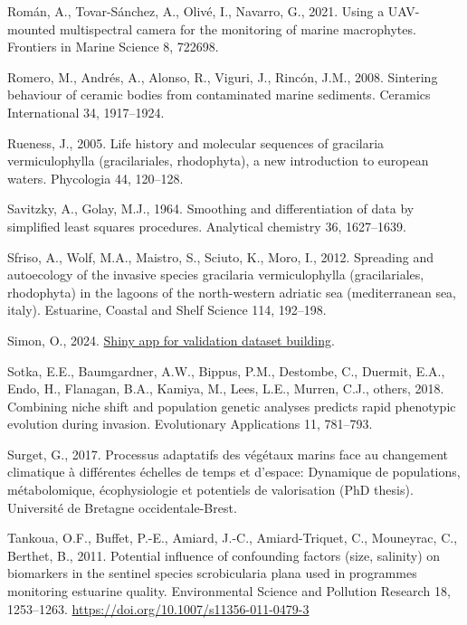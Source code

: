 \documentclass[
  letterpaper,
  DIV=11,
  numbers=noendperiod]{scrartcl}
\newlength{\cslhangindent}
\newenvironment{CSLReferences}[2] %
 {\begin{list}{}{%
  \setlength{\itemindent}{0pt}
  \setlength{\leftmargin}{0pt}
  \setlength{\parsep}{0pt}
  \ifodd #1
   \setlength{\leftmargin}{\cslhangindent}
   \setlength{\itemindent}{-1\cslhangindent}
  \fi
  \setlength{\itemsep}{#2\baselineskip}}}
 {\end{list}}
\begin{document}
\begin{CSLReferences}{1}{0}
Román, A., Tovar-Sánchez, A., Olivé, I., Navarro, G., 2021. Using a
UAV-mounted multispectral camera for the monitoring of marine
macrophytes. Frontiers in Marine Science 8, 722698.

Romero, M., Andrés, A., Alonso, R., Viguri, J., Rincón, J.M., 2008.
Sintering behaviour of ceramic bodies from contaminated marine
sediments. Ceramics International 34, 1917--1924.

Rueness, J., 2005. Life history and molecular sequences of gracilaria
vermiculophylla (gracilariales, rhodophyta), a new introduction to
european waters. Phycologia 44, 120--128.

Savitzky, A., Golay, M.J., 1964. Smoothing and differentiation of data
by simplified least squares procedures. Analytical chemistry 36,
1627--1639.

Sfriso, A., Wolf, M.A., Maistro, S., Sciuto, K., Moro, I., 2012.
Spreading and autoecology of the invasive species gracilaria
vermiculophylla (gracilariales, rhodophyta) in the lagoons of the
north-western adriatic sea (mediterranean sea, italy). Estuarine,
Coastal and Shelf Science 114, 192--198.

Simon, O., 2024.
\href{https://oirysimon.shinyapps.io/shiny_validate/}{Shiny app for
validation dataset building}.

Sotka, E.E., Baumgardner, A.W., Bippus, P.M., Destombe, C., Duermit,
E.A., Endo, H., Flanagan, B.A., Kamiya, M., Lees, L.E., Murren, C.J.,
others, 2018. Combining niche shift and population genetic analyses
predicts rapid phenotypic evolution during invasion. Evolutionary
Applications 11, 781--793.

Surget, G., 2017. Processus adaptatifs des v{é}g{é}taux marins face au
changement climatique {à} diff{é}rentes {é}chelles de temps et d'espace:
Dynamique de populations, m{é}tabolomique, {é}cophysiologie et
potentiels de valorisation (PhD thesis). Universit{é} de Bretagne
occidentale-Brest.

Tankoua, O.F., Buffet, P.-E., Amiard, J.-C., Amiard-Triquet, C.,
Mouneyrac, C., Berthet, B., 2011. Potential influence of confounding
factors (size, salinity) on biomarkers in the sentinel species
scrobicularia plana used in programmes monitoring estuarine quality.
Environmental Science and Pollution Research 18, 1253--1263.
\url{https://doi.org/10.1007/s11356-011-0479-3}


\end{CSLReferences}
\end{document}
